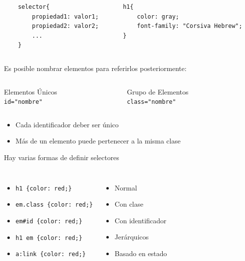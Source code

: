 \documentclass{beamer}
\begin{document}
\begin{frame}[fragile]
	\begin{columns}[c]
	\scriptsize{
	\begin{center}
	\begin{verbatim}
	selector{
	    propiedad1: valor1;
	    propiedad2: valor2;
	    ...
	}
	\end{verbatim}
\end{center}
	}
	\pause
	\scriptsize{
	\begin{center}
	\begin{verbatim}
	h1{
	    color: gray;
	    font-family: "Corsiva Hebrew";
	}
	\end{verbatim}
	\end{center}
	}
\end{columns}
\end{frame}

\begin{frame}[fragile]
Es posible nombrar elementos para referirlos posteriormente:
	\begin{columns}[t]
	\column{5cm}
	\begin{block}{Elementos Únicos}
	\verb|       id="nombre"|
	\end{block}
	\column{5cm}
	\begin{block}{Grupo de Elementos}
	\verb|     class="nombre"|
	\end{block}
	\end{columns}
	\pause
	\begin{itemize}
	\item Cada identificador deber ser único
	\item Más de un elemento puede pertenecer a la misma clase
	\end{itemize}
\end{frame}

\begin{frame}[fragile]
Hay varias formas de definir selectores
\begin{columns}[t]
	\begin{itemize}
	\item \verb|h1 {color: red;}|
	\item \verb|em.class {color: red;}|
	\item \verb|em#id {color: red;}|
	\item \verb|h1 em {color: red;}|
	\item \verb|a:link {color: red;}|
	\end{itemize}
	\pause
	\begin{itemize}[<+->]
	\item Normal
	\item Con clase
	\item Con identificador
	\item Jerárquicos
	\item Basado en estado
	\end{itemize}
\end{columns}
\end{frame}
\end{document}
